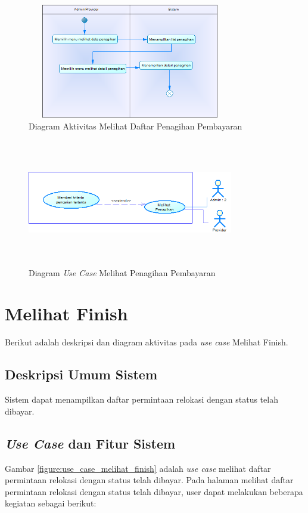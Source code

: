	\begin{figure}[h!]
	\centerline {\includegraphics[width=9cm,height=5cm]{bab4/ActivityDiagram_MelihatPenagihan.png}}
	\caption{Diagram Aktivitas Melihat Daftar Penagihan Pembayaran}
	\label{figure:activity_melihat_penagihan}
	\end{figure}

	\begin{figure}[h!]
	\centerline
	{\includegraphics[width=9cm,height=5.5cm]{bab4/use-case-melihat-penagihan.png}}
	\caption{Diagram \textit{Use Case} Melihat Penagihan Pembayaran}
	\label{figure:use_case_melihat_penagihan}
	\end{figure}
	
\section{Melihat Finish}
Berikut adalah deskripsi dan diagram aktivitas pada \textit{use case} Melihat Finish.
\subsection{Deskripsi Umum Sistem}
\tab Sistem dapat menampilkan daftar permintaan relokasi dengan status telah dibayar.
\subsection{\textit{Use Case} dan Fitur Sistem}
Gambar \ref{figure:use_case_melihat_finish} adalah \textit{use case} melihat daftar permintaan relokasi dengan status telah dibayar. Pada halaman melihat daftar permintaan relokasi dengan status telah dibayar, user dapat melakukan beberapa kegiatan sebagai berikut:
